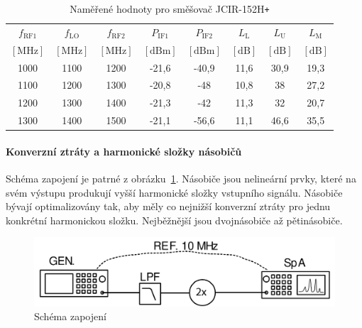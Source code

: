 \documentclass[11pt,a4paper]{article}
\newcommand{\plus}{{\texttt{+}}}
\begin{document}
\begin{table}[!ht]
    \centering
    \begin{tabular}{| c | c | c || c | c || c | c | c |}
        \hline
        $f_{\mathrm{RF1}}$ & $f_{\mathrm{LO}}$ & $f_{\mathrm{RF2}}$ & $P_{\mathrm{IF1}}$ & $P_{\mathrm{IF2}}$ & $L_{\mathrm{L}}$ & $L_{\mathrm{U}}$ & $L_{\mathrm{M}}$\\
        $[\mathrm{MHz}]$ & $[\mathrm{MHz}]$ & $[\mathrm{MHz}]$ & $[\mathrm{dBm}]$ & $[\mathrm{dBm}]$ & $[\mathrm{dB}]$ & $[\mathrm{dB}]$ & $[\mathrm{dB}]$\\
        \hline\hline
        1000 & 1100 & 1200 & -21,6 & -40,9 & 11,6 & 30,9 & 19,3\\
        \hline
        1100 & 1200 & 1300 & -20,8 & -48 & 10,8 & 38 & 27,2\\
        \hline
        1200 & 1300 & 1400 & -21,3 & -42 & 11,3 & 32 & 20,7\\
        \hline
        1300 & 1400 & 1500 & -21,1 & -56,6 & 11,1 & 46,6 & 35,5\\
        \hline
    \end{tabular}
    \caption{Naměřené hodnoty pro směšovač JCIR-152H\plus}
    \label{table:task3-data_JCIR-152H+}
\end{table}

\paragraph*{Konverzní ztráty a harmonické složky násobičů} Schéma zapojení je patrné z obrázku~\ref{fig:task4-zapojeni}. Násobiče jsou nelineární prvky, které na svém výstupu produkují vyšší harmonické složky vstupního signálu. Násobiče bývají optimalizovány tak, aby měly co nejnižší konverzní ztráty pro jednu konkrétní harmonickou složku. Nejběžnější jsou dvojnásobiče až pětinásobiče.
\begin{figure}[!ht]
    \centering
    \includegraphics[width=.65\textwidth]{src/task4-zapojeni.png}
    \caption{Schéma zapojení}
    \label{fig:task4-zapojeni}
\end{figure}
\end{document}
